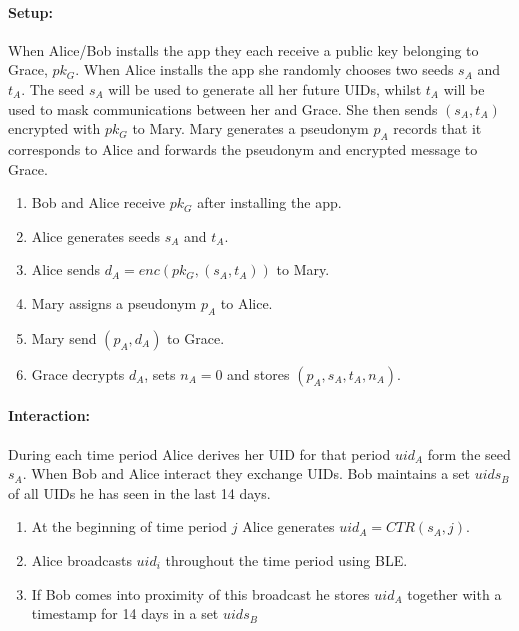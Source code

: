 \documentclass{article}
\begin{document}

\paragraph{Setup:}
When Alice/Bob installs the app they each receive a public key belonging to Grace, $pk_G$. When Alice installs the app she randomly chooses two seeds $s_A$ and $t_A$. The seed $s_A$ will be used to generate all her future UIDs, whilst $t_A$ will be used to mask communications between her and Grace. She then sends $(s_A,t_A)$ encrypted with $pk_G$ to Mary. Mary generates a pseudonym $p_A$ records that it corresponds to Alice and forwards the pseudonym and encrypted message to Grace.

\begin{enumerate}
    \item Bob and Alice receive $pk_G$ after installing the app.
    \item Alice generates seeds $s_A$ and $t_A$.
    \item Alice sends $d_A=\mathit{enc}(pk_G,(s_A,t_A))$ to Mary.
    \item Mary assigns a pseudonym $p_A$ to Alice.
    \item Mary send $(p_A,d_A)$ to Grace.
    \item Grace decrypts $d_A$, sets $n_A=0$ and stores $(p_A,s_A,t_A,n_A)$.
\end{enumerate}

\paragraph{Interaction:}
During each time period Alice derives her UID for that period $uid_A$ form the seed $s_A$. When Bob and Alice interact they exchange UIDs. Bob maintains a set $uids_B$ of all UIDs he has seen in the last 14 days.

\begin{enumerate}
    \item At the beginning of time period $j$ Alice generates $uid_A=\mathit{CTR}(s_A,j)$.
    \item Alice broadcasts $uid_i$ throughout the time period using BLE.
    \item If Bob comes into proximity of this broadcast he stores $uid_A$ together with a timestamp for 14 days in a set $uids_B$
\end{enumerate}
\end{document}
